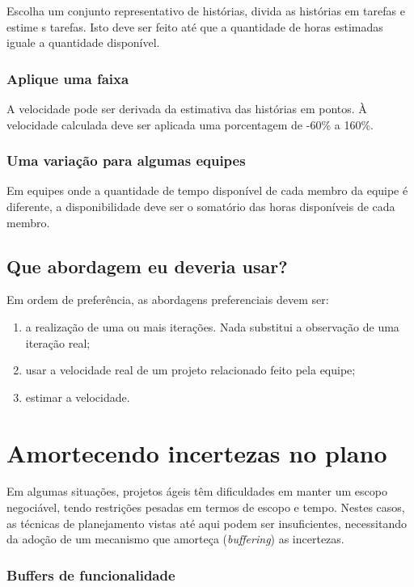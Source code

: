 \documentclass[a4paper,abntfigtabnum,noindentfirst]{abnt}
\begin{document}
Escolha um conjunto representativo de histórias, divida as histórias em tarefas e estime s tarefas. Isto deve ser feito até que a quantidade de horas estimadas iguale a quantidade disponível. 

\subsection{Aplique uma faixa}

A velocidade pode ser derivada da estimativa das histórias em pontos. À velocidade calculada deve ser aplicada uma porcentagem de -60\% a 160\%.

\subsection{Uma variação para algumas equipes}

Em equipes onde a quantidade de tempo disponível de cada membro da equipe é diferente, a disponibilidade deve ser o somatório das horas disponíveis de cada membro.


\section{Que abordagem eu deveria usar?}

Em ordem de preferência, as abordagens preferenciais devem ser:
\begin{enumerate}
 \item a realização de uma ou mais iterações. Nada substitui a observação de uma iteração real;
 \item usar a velocidade real de um projeto relacionado feito pela equipe;
 \item estimar a velocidade.
\end{enumerate}



\chapter{Amortecendo incertezas no plano}

Em algumas situações, projetos ágeis têm dificuldades em manter um escopo negociável, tendo restrições pesadas em termos de escopo e tempo. Nestes casos, as técnicas de planejamento vistas até aqui podem ser insuficientes, necessitando da adoção de um mecanismo que amorteça (\textit{buffering}) as incertezas.

\subsection{Buffers de funcionalidade}
\end{document}
